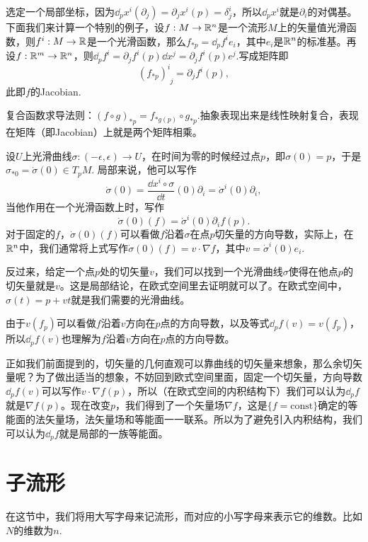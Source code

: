 选定一个局部坐标，因为$\dd_p x^i(\partial_j)=\partial_jx^i(p)=\delta^i_j$，所以$\dd_p x^i$就是$\partial_i$的对偶基。下面我们来计算一个特别的例子，设$f:M\to \mathbb{R}^n$是一个流形$M$上的矢量值光滑函数，则$f^i:M\to \mathbb{R}$是一个光滑函数，那么$f_{*p}=\dd_pf^i e_i$，其中$e_i$是$\mathbb{R}^n$的标准基。再设$f:\mathbb{R}^m\to \mathbb{R}^n$，则$\dd_pf^i=\partial_j f^i(p) \dd x^j=\partial_j f^i(p) e^j$.写成矩阵即
\[
	(f_{*p})^{i}_{\phantom{i}j}=\partial_j f^i(p),
\]
此即$f$的Jacobian.

\begin{para}
复合函数求导法则：$(f\circ g)_{*p}=f_{*g(p)}\circ g_{*p}$.抽象表现出来是线性映射复合，表现在矩阵（即Jacobian）上就是两个矩阵相乘。
\end{para}

\para 设$U$上光滑曲线$\sigma:(-\epsilon,\epsilon)\to U$，在时间为零的时候经过点$p$，即$\sigma(0)=p$，于是$\sigma_{*0}=\dot\sigma(0)\in T_pM$. 局部来说，他可以写作
\[
	\dot{\sigma}(0)=\frac{\dd x^i\circ \sigma}{\dd t}(0)\partial_i=\dot \sigma^i(0)\partial_i,
\]
当他作用在一个光滑函数上时，写作
\[
	\dot{\sigma}(0)(f)=\dot \sigma^i(0)\partial_if(p).
\]
对于固定的$f$，$\dot{\sigma}(0)(f)$可以看做$f$沿着$\sigma$在点$p$切矢量的方向导数，实际上，在$\mathbb{R}^n$中，我们通常将上式写作$\dot{\sigma}(0)(f)=v\cdot \nabla f$，其中$v=\dot \sigma^i(0)e_i$.

反过来，给定一个点$p$处的切矢量$v$，我们可以找到一个光滑曲线$\sigma$使得在他点$p$的切矢量就是$v$。这是局部结论，在欧式空间里去证明就可以了。在欧式空间中，$\sigma(t)=p+vt$就是我们需要的光滑曲线。

\para 由于$v(f_p)$可以看做$f$沿着$v$方向在$p$点的方向导数，以及等式$\dd_pf(v)=v(f_p)$，所以$\dd_pf(v)$也理解为$f$沿着$v$方向在$p$点的方向导数。

正如我们前面提到的，切矢量的几何直观可以靠曲线的切矢量来想象，那么余切矢量呢？为了做出适当的想象，不妨回到欧式空间里面，固定一个切矢量，方向导数$\dd_pf(v)$可以写作$v\cdot \nabla f(p)$，所以（在欧式空间的内积结构下）我们可以认为$\dd_pf$就是$\nabla f(p)$。现在改变$p$，我们得到了一个矢量场$\nabla f$，这是$\{f=\text{const}\}$确定的等能面的法矢量场，法矢量场和等能面一一联系。所以为了避免引入内积结构，我们可以认为$\dd_pf$就是局部的一族等能面。

\section{子流形}

在这节中，我们将用大写字母来记流形，而对应的小写字母来表示它的维数。比如$N$的维数为$n$.

